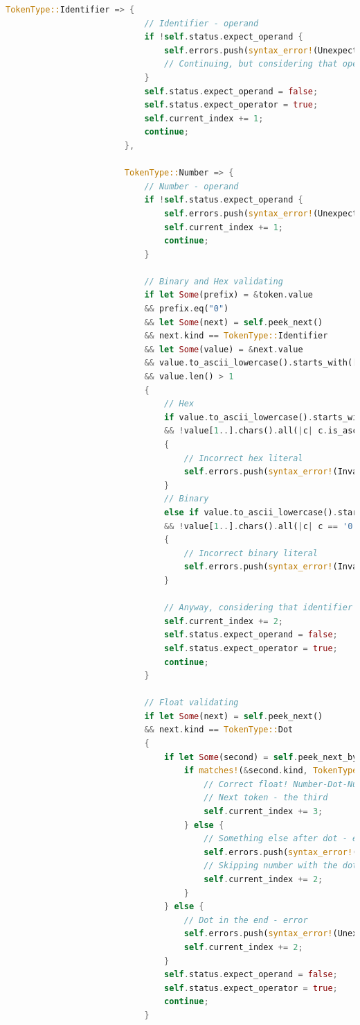 \documentclass[14pt, a4paper]{extreport}
\begin{document}
\begin{lstlisting}[language=Rust]
						TokenType::Identifier => {
							// Identifier - operand
							if !self.status.expect_operand {
								self.errors.push(syntax_error!(UnexpectedOperand, token));
								// Continuing, but considering that operand was read
							}
							self.status.expect_operand = false;
							self.status.expect_operator = true;
							self.current_index += 1;
							continue;
						},
						
						TokenType::Number => {
							// Number - operand
							if !self.status.expect_operand {
								self.errors.push(syntax_error!(UnexpectedOperand, token));
								self.current_index += 1;
								continue;
							}
							
							// Binary and Hex validating
							if let Some(prefix) = &token.value
							&& prefix.eq("0")
							&& let Some(next) = self.peek_next()
							&& next.kind == TokenType::Identifier
							&& let Some(value) = &next.value
							&& value.to_ascii_lowercase().starts_with(['x', 'b'])
							&& value.len() > 1
							{
								// Hex
								if value.to_ascii_lowercase().starts_with('x')
								&& !value[1..].chars().all(|c| c.is_ascii_hexdigit())
								{
									// Incorrect hex literal
									self.errors.push(syntax_error!(InvalidHexLiteral, next));
								}
								// Binary
								else if value.to_ascii_lowercase().starts_with('b')
								&& !value[1..].chars().all(|c| c == '0' || c == '1')
								{
									// Incorrect binary literal
									self.errors.push(syntax_error!(InvalidBinaryLiteral, next));
								}
								
								// Anyway, considering that identifier was read
								self.current_index += 2;
								self.status.expect_operand = false;
								self.status.expect_operator = true;
								continue;
							}
							
							// Float validating
							if let Some(next) = self.peek_next()
							&& next.kind == TokenType::Dot
							{
								if let Some(second) = self.peek_next_by(2) {
									if matches!(&second.kind, TokenType::Number) {
										// Correct float! Number-Dot-Number
										// Next token - the third
										self.current_index += 3;
									} else {
										// Something else after dot - error
										self.errors.push(syntax_error!(InvalidFloat, next));
										// Skipping number with the dot
										self.current_index += 2;
									}
								} else {
									// Dot in the end - error
									self.errors.push(syntax_error!(UnexpectedOperator, next));
									self.current_index += 2;
								}
								self.status.expect_operand = false;
								self.status.expect_operator = true;
								continue;
							}
							

\end{lstlisting}
\end{document}
